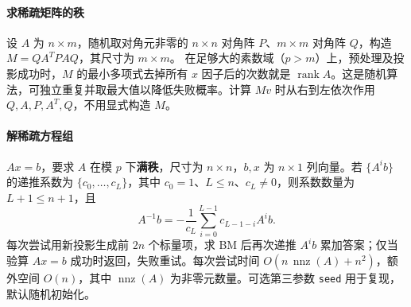 \paragraph*{求稀疏矩阵的秩}

	设 $A$ 为 $n\times m$，随机取对角元非零的 $n\times n$ 对角阵 $P$、$m\times m$ 对角阵 $Q$，构造 $M=QA^TPAQ$，其尺寸为 $m\times m$。
	在足够大的素数域（$p>m$）上，预处理及投影成功时，$M$ 的最小多项式去掉所有 $x$ 因子后的次数就是 $\operatorname{rank}A$。这是随机算法，可独立重复并取最大值以降低失败概率。计算 $Mv$ 时从右到左依次作用 $Q,A,P,A^T,Q$，不用显式构造 $M$。

\paragraph*{解稀疏方程组}

	$Ax=b$，要求 $A$ 在模 $p$ 下\textbf{满秩}，尺寸为 $n\times n$，$b,x$ 为 $n\times1$ 列向量。若 $\{A^ib\}$ 的递推系数为 $\{c_0,\ldots,c_L\}$，其中 $c_0=1$、$L\le n$、$c_L\ne0$，则系数数量为 $L+1\le n+1$，且
	$$A^{-1}b=-\frac1{c_L}\sum_{i=0}^{L-1}c_{L-1-i}A^ib.$$
	每次尝试用新投影生成前 $2n$ 个标量项，求 BM 后再次递推 $A^ib$ 累加答案；仅当验算 $Ax=b$ 成功时返回，失败重试。每次尝试时间 $O(n\,\operatorname{nnz}(A)+n^2)$，额外空间 $O(n)$，其中 $\operatorname{nnz}(A)$ 为非零元数量。可选第三参数 \texttt{seed} 用于复现，默认随机初始化。
	
	\inputminted{cpp}{sections/Polynomial/assets/Math/解稀疏方程组.cpp}
